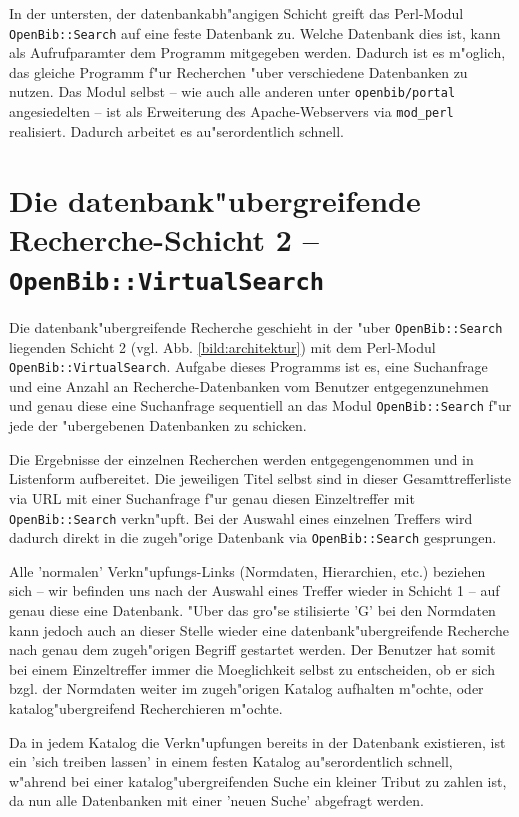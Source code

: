\documentclass[11pt, twoside, a4paper, BCOR8mm, DIV12, bibtotoc,idxtotoc]{scrbook}
\begin{document}
In der untersten, der datenbankabh"angigen Schicht greift das Perl-Modul
\texttt{OpenBib::Search} auf eine feste Datenbank zu. Welche
Datenbank dies ist, kann als Aufrufparamter dem Programm mitgegeben
werden. Dadurch ist es m"oglich, das gleiche Programm f"ur Recherchen
"uber ver\-schie\-de\-ne Daten\-banken zu nutzen. Das Modul selbst -- wie
auch alle anderen unter \texttt{openbib/portal} angesiedelten -- ist als
Erweiterung des Apache-Webservers via \texttt{mod\_perl} realisiert.
Dadurch arbeitet es au"ser\-ordentlich schnell.


\section{Die datenbank"ubergreifende Recherche-Schicht 2 -- \texttt{OpenBib::VirtualSearch}}

Die datenbank"ubergreifende Recherche geschieht in der "uber
\texttt{OpenBib::Search} liegenden Schicht 2 (vgl. Abb.
\ref{bild:architektur}) mit dem Perl-Modul
\texttt{OpenBib::VirtualSearch}. Aufgabe dieses Programms ist es,
eine Suchanfrage und eine Anzahl an Recherche-Datenbanken vom Benutzer
entgegen\-zuneh\-men und genau diese eine Suchanfrage sequentiell an das
Modul \texttt{OpenBib::Search} f"ur jede der "ubergebenen
Datenbanken zu schicken. 

Die Ergebnisse der einzelnen Recherchen werden entgegengenommen und in
Listenform auf\-be\-rei\-tet. Die jeweiligen Titel selbst sind in dieser
Gesamttrefferliste via URL mit einer Suchanfrage f"ur genau diesen
Einzeltreffer mit \texttt{OpenBib::Search} verkn"upft. 
Bei der
Auswahl eines einzelnen Treffers wird dadurch direkt in die
zugeh"orige Datenbank via \texttt{OpenBib::Search} gesprungen. 

Alle 'normalen' Verkn"upfungs-Links (Normdaten, Hierarchien, etc.)
beziehen sich -- wir befinden uns nach der Auswahl eines Treffer wieder in
Schicht 1 -- auf genau diese eine Datenbank. "Uber das gro"se
stilisierte 'G' bei den Normdaten kann jedoch auch an dieser Stelle
wieder eine datenbank"ubergreifende Recherche nach genau dem
zugeh"origen Begriff gestartet werden. Der Benutzer hat somit bei
einem Einzeltreffer immer die Moeglichkeit selbst zu entscheiden, ob
er sich bzgl. der Normdaten weiter im zugeh"origen Katalog aufhalten
m"ochte, oder katalog"ubergreifend Recherchieren m"ochte.

Da in jedem Katalog die Verkn"upfungen bereits in der Datenbank
existieren, ist ein 'sich treiben lassen' in einem festen Katalog
au"ser\-ordentlich schnell, w"ahrend bei einer katalog"ubergreifenden
Suche ein kleiner Tribut zu zahlen ist, da nun alle Datenbanken mit
einer 'neuen Suche' abgefragt werden.
\end{document}
